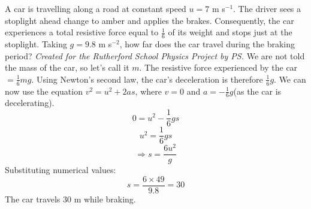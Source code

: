 \begin{problem} 
{A car is travelling along a road at constant speed $u = 7$ m s$^{-1}$. The driver sees a stoplight ahead change to amber and applies the brakes. Consequently, the car experiences a total resistive force equal to $\frac{1}{6}$ of its weight and stops just at the stoplight. Taking $g = 9.8$ m s$^{-2}$, how far does the car travel during the braking period?
}
{\textit{Created for the Rutherford School Physics Project by PS.}}
{We are not told the mass of the car, so let's call it $m$. The resistive force experienced by the car $= \frac{1}{6}mg$. Using Newton's second law, the car's deceleration is therefore $\frac{1}{6}g$. We can now use the equation $v^2 = u^2 + 2as$, where $v = 0$ and $a = -\frac{1}{6}g$(as the car is decelerating).
\begin{equation*}	0 = u^2 - \frac{1}{6}gs	\end{equation*}
\begin{equation*}	u^2 = \frac{1}{6}gs	\end{equation*}
\begin{equation*}	\Rightarrow s = \frac{6u^2}{g}	\end{equation*}
Substituting numerical values:
\begin{equation*}	s = \frac{6\times 49}{9.8} = 30	\end{equation*}
The car travels 30 m while braking.
}
\end{problem}